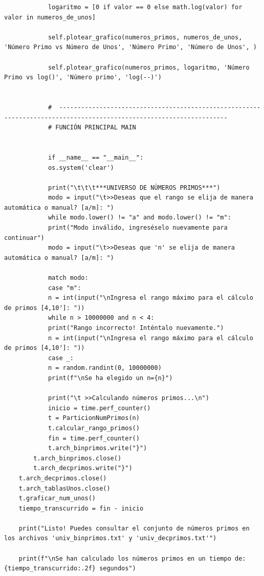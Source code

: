 \documentclass[11pt]{article} %
\begin{document}
\begin{lstlisting}
			logaritmo = [0 if valor == 0 else math.log(valor) for valor in numeros_de_unos]
			
			self.plotear_grafico(numeros_primos, numeros_de_unos, 'Número Primo vs Número de Unos', 'Número Primo', 'Número de Unos', )
			
			self.plotear_grafico(numeros_primos, logaritmo, 'Número Primo vs log()', 'Número primo', 'log(--)')
			
			
			#  --------------------------------------------------------------------------------------------------------------------
			# FUNCIÓN PRINCIPAL MAIN
			
			
			if __name__ == "__main__":
			os.system('clear')
			
			print("\t\t\t***UNIVERSO DE NÚMEROS PRIMOS***")
			modo = input("\t>>Deseas que el rango se elija de manera automática o manual? [a/m]: ")
			while modo.lower() != "a" and modo.lower() != "m":
			print("Modo inválido, ingreséselo nuevamente para continuar")
			modo = input("\t>>Deseas que 'n' se elija de manera automática o manual? [a/m]: ")
			
			match modo:
			case "m":
			n = int(input("\nIngresa el rango máximo para el cálculo de primos [4,10⁷]: "))
			while n > 10000000 and n < 4:
			print("Rango incorrecto! Inténtalo nuevamente.")
			n = int(input("\nIngresa el rango máximo para el cálculo de primos [4,10⁷]: "))
			case _:
			n = random.randint(0, 10000000)
			print(f"\nSe ha elegido un n={n}")
			
			print("\t >>Calculando números primos...\n")
			inicio = time.perf_counter()
			t = ParticionNumPrimos(n)
			t.calcular_rango_primos()
			fin = time.perf_counter()
			t.arch_binprimos.write("}")
		t.arch_binprimos.close()
		t.arch_decprimos.write("}")
	t.arch_decprimos.close()
	t.arch_tablasUnos.close()
	t.graficar_num_unos()
	tiempo_transcurrido = fin - inicio
	
	print("Listo! Puedes consultar el conjunto de números primos en los archivos 'univ_binprimos.txt' y 'univ_decprimos.txt'")
	
	print(f"\nSe han calculado los números primos en un tiempo de: {tiempo_transcurrido:.2f} segundos")
	
	\end{lstlisting}
	
	
	
	
	
\end{document}
